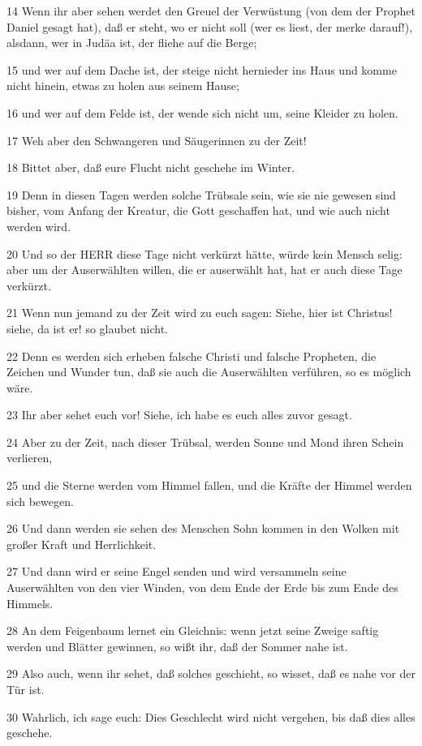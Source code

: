 \par 14 Wenn ihr aber sehen werdet den Greuel der Verwüstung (von dem der Prophet Daniel gesagt hat), daß er steht, wo er nicht soll (wer es liest, der merke darauf!), alsdann, wer in Judäa ist, der fliehe auf die Berge;
\par 15 und wer auf dem Dache ist, der steige nicht hernieder ins Haus und komme nicht hinein, etwas zu holen aus seinem Hause;
\par 16 und wer auf dem Felde ist, der wende sich nicht um, seine Kleider zu holen.
\par 17 Weh aber den Schwangeren und Säugerinnen zu der Zeit!
\par 18 Bittet aber, daß eure Flucht nicht geschehe im Winter.
\par 19 Denn in diesen Tagen werden solche Trübsale sein, wie sie nie gewesen sind bisher, vom Anfang der Kreatur, die Gott geschaffen hat, und wie auch nicht werden wird.
\par 20 Und so der HERR diese Tage nicht verkürzt hätte, würde kein Mensch selig: aber um der Auserwählten willen, die er auserwählt hat, hat er auch diese Tage verkürzt.
\par 21 Wenn nun jemand zu der Zeit wird zu euch sagen: Siehe, hier ist Christus! siehe, da ist er! so glaubet nicht.
\par 22 Denn es werden sich erheben falsche Christi und falsche Propheten, die Zeichen und Wunder tun, daß sie auch die Auserwählten verführen, so es möglich wäre.
\par 23 Ihr aber sehet euch vor! Siehe, ich habe es euch alles zuvor gesagt.
\par 24 Aber zu der Zeit, nach dieser Trübsal, werden Sonne und Mond ihren Schein verlieren,
\par 25 und die Sterne werden vom Himmel fallen, und die Kräfte der Himmel werden sich bewegen.
\par 26 Und dann werden sie sehen des Menschen Sohn kommen in den Wolken mit großer Kraft und Herrlichkeit.
\par 27 Und dann wird er seine Engel senden und wird versammeln seine Auserwählten von den vier Winden, von dem Ende der Erde bis zum Ende des Himmels.
\par 28 An dem Feigenbaum lernet ein Gleichnis: wenn jetzt seine Zweige saftig werden und Blätter gewinnen, so wißt ihr, daß der Sommer nahe ist.
\par 29 Also auch, wenn ihr sehet, daß solches geschieht, so wisset, daß es nahe vor der Tür ist.
\par 30 Wahrlich, ich sage euch: Dies Geschlecht wird nicht vergehen, bis daß dies alles geschehe.
